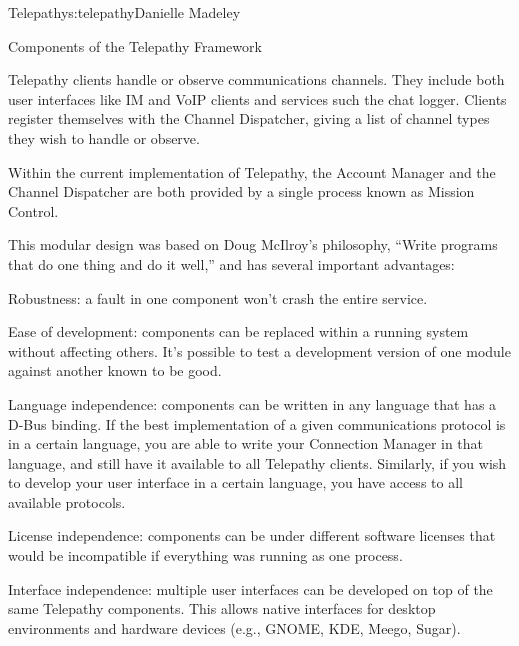 \begin{aosachapter}{Telepathy}{s:telepathy}{Danielle Madeley}
\begin{aosasect1}{Components of the Telepathy Framework}
\begin{aosaitemize}
  \item Telepathy clients handle or observe communications
    channels. They include both user interfaces like IM and VoIP
    clients and services such the chat logger. Clients register
    themselves with the Channel Dispatcher, giving a list of channel
    types they wish to handle or observe.

\end{aosaitemize}

Within the current implementation of Telepathy, the Account Manager
and the Channel Dispatcher are both provided by a single process known
as Mission Control.


This modular design was based on Doug McIlroy's philosophy, ``Write
programs that do one thing and do it well,'' and has several important
advantages:

\pagebreak

\begin{aosadescription}

  \item{Robustness:} a fault in one component won't crash the
  entire service.

  \item{Ease of development:} components can be replaced within
  a running system without affecting others. It's possible to test a
  development version of one module against another known to be
  good.

  \item{Language independence:} components can be written in any
  language that has a D-Bus binding. If the best
  implementation of a given communications protocol is in a certain
  language, you are able to write your Connection Manager in that
  language, and still have it available to all Telepathy clients.
  Similarly, if you wish to develop your user interface in a certain
  language, you have access to all available protocols.

  \item{License independence:} components can be under different
  software licenses that would be incompatible if everything was
  running as one process.

  \item{Interface independence:} multiple user interfaces can be
  developed on top of the same Telepathy components. This allows native
  interfaces for desktop environments and hardware devices
  (e.g., GNOME, KDE, Meego, Sugar).


\end{aosadescription}
\end{aosasect1}
\end{aosachapter}
